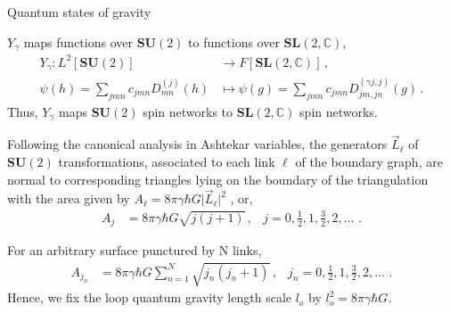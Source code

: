 \documentclass{beamer}
\begin{document}
\begin{frame}{Quantum states of gravity}
    \begin{list}{\maltese}{\leftmargin=1em \itemindent=0em}
        \item<1-> $Y_\gamma$ maps functions over $\mathbf{SU}(2)$ to functions over $\mathbf{SL}(2,\mathbb{C})$,
        \begin{align}
            Y_\gamma:L^2[\mathbf{SU}(2)]&\to F[\mathbf{SL}(2,\mathbb{C})] \,,\\
            \psi(h)= \sum_{jmn}c_{jmn}D^{(j)}_{mn}(h)&\mapsto \psi(g)= \sum_{jmn} c_{jmn}D^{(\gamma j,j)}_{jm,jn}(g)\,.
        \end{align}
        Thus, $Y_\gamma$ maps $\mathbf{SU}(2)$ spin networks to $\mathbf{SL}(2,\mathbb{C})$ spin networks.
        \item<2-> Following the canonical analysis in Ashtekar variables, the generators $\vec{L}_\ell$ of $\mathbf{SU}(2)$ transformations, associated to each link $\ell$ of the boundary graph, are normal to corresponding triangles lying on the boundary of the triangulation with the area given by $A_\ell=8\pi\gamma\hbar G \lvert \vec{L}_\ell \rvert^2$ , or,
        \begin{align}
             A_j&=8\pi\gamma\hbar G\sqrt{j(j+1)}\,, &j=0,\frac{1}{2},1,\frac{3}{2},2,\dots\,\,.
        \end{align}
        \item<3-> For an arbitrary surface punctured by N links,
        \begin{align}
            A_{j_n}&=8\pi\gamma\hbar G\sum_{n=1}^N\sqrt{j_n(j_n+1)}\,, &j_n=0,\frac{1}{2},1,\frac{3}{2},2,\dots\,\,.
        \end{align}
        Hence, we fix the loop quantum gravity length scale $l_o$ by $l_o^2=8\pi\gamma\hbar G$.
    \end{list}
\end{frame}
\end{document}
